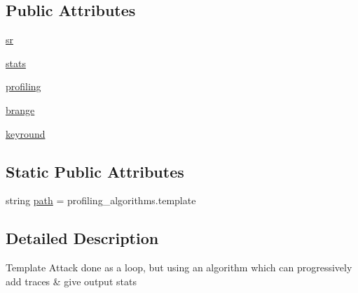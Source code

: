 \subsection*{Public Attributes}
\begin{DoxyCompactItemize}
\item 
\hyperlink{classsoftware_1_1chipwhisperer_1_1analyzer_1_1attacks_1_1profiling__algorithms_1_1template_1_1ProfilingTemplate_abb7b9c53e7e3f3eb5a3dac885af8b329}{sr}
\item 
\hyperlink{classsoftware_1_1chipwhisperer_1_1analyzer_1_1attacks_1_1profiling__algorithms_1_1template_1_1ProfilingTemplate_a23bdc3d599b21c33f56bb6cf2e29fb16}{stats}
\item 
\hyperlink{classsoftware_1_1chipwhisperer_1_1analyzer_1_1attacks_1_1profiling__algorithms_1_1template_1_1ProfilingTemplate_a55db6d81473c29a771ba813ebdbde517}{profiling}
\item 
\hyperlink{classsoftware_1_1chipwhisperer_1_1analyzer_1_1attacks_1_1profiling__algorithms_1_1template_1_1ProfilingTemplate_a3fa5a3b2304e49b52cf7672c120f5908}{brange}
\item 
\hyperlink{classsoftware_1_1chipwhisperer_1_1analyzer_1_1attacks_1_1profiling__algorithms_1_1template_1_1ProfilingTemplate_a3ae2ff09ae6a7134dedd457bda82f98a}{keyround}
\end{DoxyCompactItemize}
\subsection*{Static Public Attributes}
\begin{DoxyCompactItemize}
\item 
string \hyperlink{classsoftware_1_1chipwhisperer_1_1analyzer_1_1attacks_1_1profiling__algorithms_1_1template_1_1ProfilingTemplate_abb2bc4c23ef1dbb79b1c899863409ef4}{path} = \textquotesingle{}profiling\+\_\+algorithms.\+template\textquotesingle{}
\end{DoxyCompactItemize}


\subsection{Detailed Description}
\begin{DoxyVerb}Template Attack done as a loop, but using an algorithm which can progressively add traces & give output stats
\end{DoxyVerb}
 

